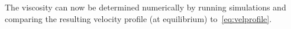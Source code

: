 \documentclass[11pt,british,a4paper]{report}
\begin{document}
The viscosity can now be determined numerically by running simulations and comparing the resulting velocity profile (at equilibrium) to~\vref{eq:velprofile}.








































\nocite{*}
\printbibliography{}
\end{document}
